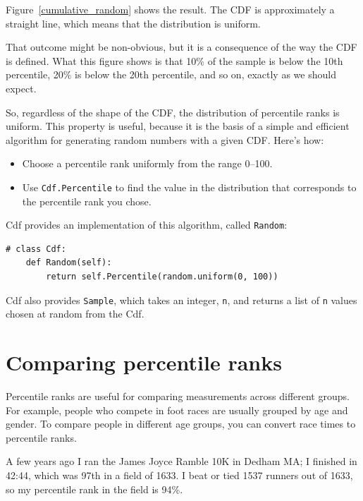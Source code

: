 \documentclass[12pt]{book}
\begin{document}
Figure~\ref{cumulative_random} shows the result.  The CDF is
approximately a straight line, which means that the distribution
is uniform.

That outcome might be non-obvious, but it is a consequence of
the way the CDF is defined.  What this figure shows is that 10\%
of the sample is below the 10th percentile, 20\% is below the
20th percentile, and so on, exactly as we should expect.

So, regardless of the shape of the CDF, the distribution of
percentile ranks is uniform.  This property is useful, because it
is the basis of a simple and efficient algorithm for generating
random numbers with a given CDF.  Here's how:

\begin{itemize}

\item Choose a percentile rank uniformly from the range 0--100.

\item Use {\tt Cdf.Percentile} to find the value in the distribution
that corresponds to the percentile rank you chose.

\end{itemize}

Cdf provides an implementation of this algorithm, called
{\tt Random}:

\begin{verbatim}
# class Cdf:
    def Random(self):
        return self.Percentile(random.uniform(0, 100))
\end{verbatim}

Cdf also provides {\tt Sample}, which takes an integer,
{\tt n}, and returns a list of {\tt n} values chosen at random
from the Cdf.


\section{Comparing percentile ranks}

Percentile ranks are useful for comparing measurements across
different groups.  For example, people who compete in foot races are
usually grouped by age and gender.  To compare people in different
age groups, you can convert race times to percentile ranks.

A few years ago I ran the James Joyce Ramble 10K in
Dedham MA; I finished in 42:44, which was 97th in a field of 1633.  I beat or
tied 1537 runners out of 1633, so my percentile rank in the field is
94\%.   
\end{document}
